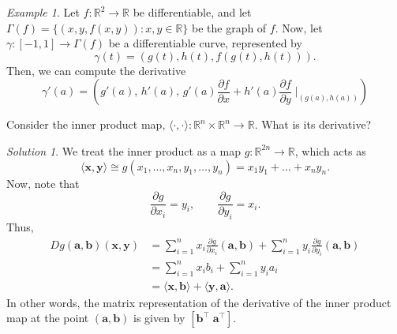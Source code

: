 \documentclass[11pt]{article}
\newcommand{\R}{\mathbb{R}}
\newcommand{\ip}[2]{\langle #1, #2 \rangle}
\renewcommand{\vec}[1]{\boldsymbol{#1}}
\newcommand{\vx}{\vec{x}}
\newcommand{\vy}{\vec{y}}
\newcommand{\va}{\vec{a}}
\newcommand{\vb}{\vec{b}}
\newcommand{\pp}[2]{\frac{\partial #1}{\partial #2}}
\theoremstyle{definition}
\theoremstyle{remark}
\newtheorem*{example}{Example}
\newtheorem*{solution}{Solution}
\numberwithin{equation}{section}
\begin{document}
    \begin{example}
        Let $f\colon \R^2\to \R$ be differentiable, and let $\Gamma(f) = \{(x, y,
        f(x, y)): x, y \in \R\}$ be the graph of $f$. Now, let $\gamma\colon [-1, 1]
        \to \Gamma(f)$ be a differentiable curve, represented by \[
            \gamma(t) = (g(t), h(t), f(g(t), h(t))).
        \] Then, we can compute the derivative \[
            \gamma'(a) = \left(g'(a),\, h'(a),\, g'(a)\pp{f}{x} + h'(a)\pp{f}{y}
            \;\Big|_{(g(a), h(a))}\right)
        \] 
    \end{example}

    \begin{exercise}
        Consider the inner product map, $\ip{\cdot}{\cdot}\colon \R^n \times \R^n \to
        \R$. What is its derivative?
        \begin{solution}
            We treat the inner product as a map $g\colon \R^{2n} \to \R$, which acts
            as \[
                \ip{\vx}{\vy} \cong g(x_1, \dots, x_n, y_1, \dots, y_n) = x_1y_1 +
                \dots + x_ny_n.
            \] Now, note that \[
                \pp{g}{x_i} = y_i, \qquad \pp{g}{y_i} = x_i.
            \] Thus, \begin{align*}
                Dg(\va, \vb)(\vx, \vy) &= \sum_{i = 1}^n x_i \pp{g}{x_i}(\va, \vb) +
                \sum_{i = 1}^n y_i \pp{g}{y_i}(\va, \vb) \\
                &= \sum_{i = 1}^n x_i b_i + \sum_{i = 1}^n y_i a_i \\
                &= \ip{\vx}{\vb} + \ip{\vy}{\va}.
            \end{align*}
            In other words, the matrix representation of the derivative of the inner
            product map at the point $(\va, \vb)$ is given by $[\vb^\top \;
            \va^\top]$.
        \end{solution}
    \end{exercise}
\end{document}
